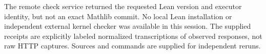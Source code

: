 \documentclass[11pt,letterpaper]{article}
\theoremstyle{definition}\newtheorem{definition}[theorem]{Definition}
\theoremstyle{remark}\newtheorem{remark}[theorem]{Remark}
\begin{document}
The remote check service returned the requested Lean version and executor identity, but not an exact Mathlib commit. No local Lean installation or independent external kernel checker was available in this session. The supplied receipts are explicitly labeled normalized transcriptions of observed responses, not raw HTTP captures. Sources and commands are supplied for independent reruns.
\clearpage
\begingroup
\fontsize{9.5pt}{10.8pt}\selectfont
\setlength{\parskip}{0pt}
\tableofcontents
\endgroup
\clearpage{}





\end{document}
